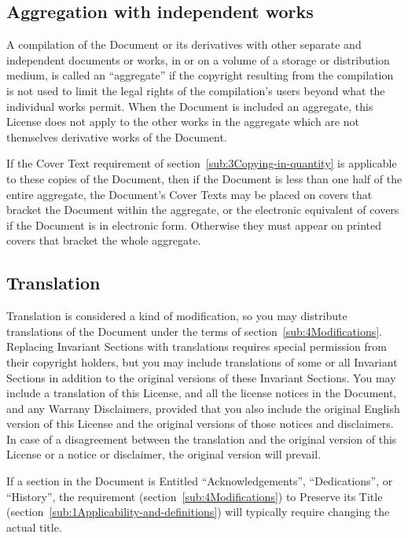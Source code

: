 \subsection{Aggregation with independent works}

A compilation of the Document or its derivatives with other separate
and independent documents or works, in or on a volume of a storage
or distribution medium, is called an ``aggregate'' if the copyright
resulting from the compilation is not used to limit the legal rights
of the compilation's users beyond what the individual works permit.
When the Document is included an aggregate, this License does not
apply to the other works in the aggregate which are not themselves
derivative works of the Document.

If the Cover Text requirement of section~\ref{sub:3Copying-in-quantity}
is applicable to these copies of the Document, then if the Document
is less than one half of the entire aggregate, the Document's Cover
Texts may be placed on covers that bracket the Document within the
aggregate, or the electronic equivalent of covers if the Document
is in electronic form. Otherwise they must appear on printed covers
that bracket the whole aggregate.


\subsection{Translation}

Translation is considered a kind of modification, so you may distribute
translations of the Document under the terms of section~\ref{sub:4Modifications}.
Replacing Invariant Sections with translations requires special permission
from their copyright holders, but you may include translations of
some or all Invariant Sections in addition to the original versions
of these Invariant Sections. You may include a translation of this
License, and all the license notices in the Document, and any Warrany
Disclaimers, provided that you also include the original English version
of this License and the original versions of those notices and disclaimers.
In case of a disagreement between the translation and the original
version of this License or a notice or disclaimer, the original version
will prevail.

If a section in the Document is Entitled ``Acknowledgements'', ``Dedications'',
or ``History'', the requirement (section~\ref{sub:4Modifications})
to Preserve its Title (section~\ref{sub:1Applicability-and-definitions})
will typically require changing the actual title.


